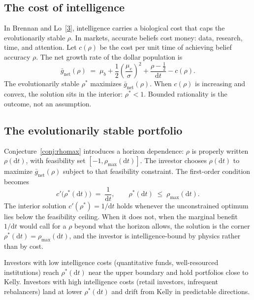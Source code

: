 \documentclass[11pt]{article}
\newcommand{\mue}{\mu_{e}}
\newcommand{\mub}{\mu_{b}}
\newcommand{\dd}{\mathrm{d}}
\begin{document}
\subsection{The cost of intelligence}

In Brennan and Lo~[\hyperlink{ref:3}{3}], intelligence carries a biological cost that
caps the evolutionarily stable $\rho$. In markets, accurate beliefs
cost money: data, research, time, and attention. Let $c(\rho)$ be
the cost per unit time of achieving belief accuracy $\rho$. The net
growth rate of the dollar population is
\begin{equation}
  \bar{g}_{\mathrm{net}}(\rho) \;=\; \mub
  + \frac{1}{2}\!\left(\frac{\mue}{\sigma}\right)^{\!2}
  + \frac{\rho - \frac{1}{2}}{\dd t} - c(\rho).
  \label{eq:netgrowth}
\end{equation}
The evolutionarily stable $\rho^{*}$ maximizes
$\bar{g}_{\mathrm{net}}(\rho)$. When $c(\rho)$ is increasing and
convex, the solution sits in the interior: $\rho^{*} < 1$. Bounded
rationality is the outcome, not an assumption.

\subsection{The evolutionarily stable portfolio}

Conjecture~\ref{conj:rhomax} introduces a horizon dependence:
$\rho$ is properly written $\rho(\dd t)$, with feasibility set
$[-1, \rho_{\max}(\dd t)]$. The investor chooses $\rho(\dd t)$ to
maximize $\bar{g}_{\mathrm{net}}(\rho)$ subject to that feasibility
constraint. The first-order condition becomes
\begin{equation}
  c'\!\bigl(\rho^{*}(\dd t)\bigr) \;=\; \frac{1}{\dd t},
  \qquad
  \rho^{*}(\dd t) \;\leq\; \rho_{\max}(\dd t).
  \label{eq:foc-rho}
\end{equation}
The interior solution $c'(\rho^{*}) = 1/\dd t$ holds whenever the
unconstrained optimum lies below the feasibility ceiling. When it
does not, when the marginal benefit $1/\dd t$ would call for a $\rho$ beyond what the horizon allows, the solution is the corner
$\rho^{*}(\dd t) = \rho_{\max}(\dd t)$, and the investor is
intelligence-bound by physics rather than by cost.

Investors with low intelligence costs (quantitative funds, well-resourced institutions) reach $\rho^{*}(\dd t)$ near the upper
boundary and hold portfolios close to Kelly. Investors with high
intelligence costs (retail investors, infrequent rebalancers) land
at lower $\rho^{*}(\dd t)$ and drift from Kelly in predictable
directions.
\end{document}

